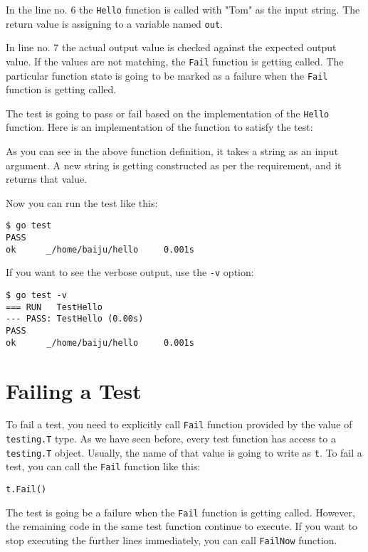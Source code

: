 In the line no. 6 the \texttt{Hello} function is called with "Tom" as
the input string.  The return value is assigning to a variable
named \texttt{out}.

In line no. 7 the actual output value is checked against the expected
output value.  If the values are not matching, the \texttt{Fail}
function is getting called.  The particular function state is going to
be marked as a failure when the \texttt{Fail} function is getting
called.

The test is going to pass or fail based on the implementation of
the \texttt{Hello} function.  Here is an implementation of the
function to satisfy the test:



As you can see in the above function definition, it takes a string as
an input argument.  A new string is getting constructed as per the
requirement, and it returns that value.

Now you can run the test like this:

\begin{lstlisting}[numbers=none]
$ go test
PASS
ok      _/home/baiju/hello     0.001s
\end{lstlisting}

If you want to see the verbose output, use the \texttt{-v} option:

\begin{lstlisting}[numbers=none]
$ go test -v
=== RUN   TestHello
--- PASS: TestHello (0.00s)
PASS
ok      _/home/baiju/hello     0.001s
\end{lstlisting}

\section{Failing a Test}

To fail a test, you need to explicitly call \texttt{Fail} function
provided by the value of \texttt{testing.T} type.  As we have seen
before, every test function has access to a \texttt{testing.T} object.
Usually, the name of that value is going to write as \texttt{t}. To
fail a test, you can call the \texttt{Fail} function like this:

\begin{lstlisting}[numbers=none]
t.Fail()
\end{lstlisting}

The test is going be a failure when the \texttt{Fail} function is
getting called.  However, the remaining code in the same test function
continue to execute.  If you want to stop executing the further lines
immediately, you can call \texttt{FailNow} function.

